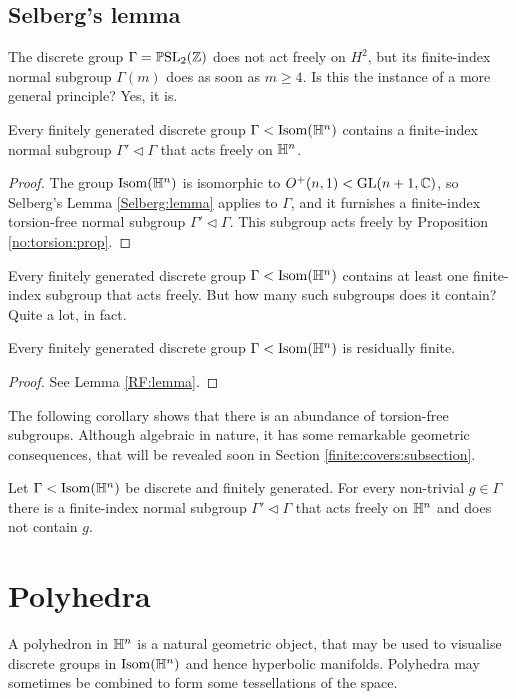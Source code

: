 \subsection{Selberg's lemma}
The discrete group $\Gamma = \mathbb{P}{\rm SL}_2(\mathbb{Z})$ does not act freely on $H^2$, but its finite-index normal subgroup $\Gamma(m)$ does as soon as $m\geqslant 4$. Is this the instance of a more general principle? Yes, it is. 

\begin{prop} \label{Selberg:prop}
Every finitely generated discrete group $\Gamma < {\rm Isom}(\mathbb{H}^n)$ contains a finite-index normal subgroup $\Gamma'\triangleleft \Gamma$ that acts freely on $\mathbb{H}^n$.
\end{prop}
\begin{proof}
The group ${\rm Isom}(\mathbb{H}^n)$ is isomorphic to $O^+(n,1) < {\rm GL}(n+1,\mathbb{C})$, so Selberg's Lemma \ref{Selberg:lemma} applies to $\Gamma$, and it furnishes a finite-index torsion-free normal subgroup $\Gamma'\triangleleft \Gamma$. This subgroup acts freely by Proposition \ref{no:torsion:prop}.
\end{proof}

Every finitely generated discrete group $\Gamma < {\rm Isom}(\mathbb{H}^n)$ contains at least one finite-index subgroup that acts freely. But how many such subgroups does it contain? Quite a lot, in fact.

\begin{prop} \label{FG:RF:prop}
Every finitely generated discrete group $\Gamma<{\rm Isom}(\mathbb{H}^n)$ is residually finite.
\end{prop}
\begin{proof}
See Lemma \ref{RF:lemma}.
\end{proof}

The following corollary shows that there is an abundance of torsion-free subgroups. Although algebraic in nature, it has some remarkable geometric consequences, that will be revealed soon in Section \ref{finite:covers:subsection}.

\begin{cor}
Let $\Gamma < {\rm Isom}(\mathbb{H}^n)$ be discrete and finitely generated. For every non-trivial $g \in \Gamma$ there is a finite-index normal subgroup $\Gamma'\triangleleft \Gamma$ that acts freely on $\mathbb{H}^n$ and does not contain $g$.
\end{cor}

\section{Polyhedra} 
A polyhedron in $\mathbb{H}^n$ is a natural geometric object, that may be used to visualise discrete groups in ${\rm Isom}(\mathbb{H}^n)$ and hence hyperbolic manifolds. 
Polyhedra may sometimes be combined to form some tessellations of the space. 

